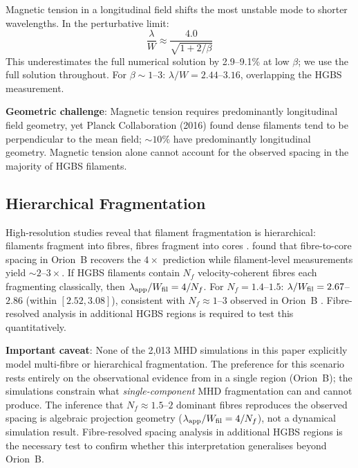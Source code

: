 \documentclass[twoside,twocolumn]{mnras}
\begin{document}
Magnetic tension in a longitudinal field \citep{Nakamura1993} shifts the most unstable
mode to shorter wavelengths. In the perturbative limit:
\begin{equation}
\frac{\lambda}{W} \approx \frac{4.0}{\sqrt{1 + 2/\beta}}
\label{eq:tension}
\end{equation}
This underestimates the full numerical solution by 2.9--9.1\% at low $\beta$; we use
the full solution throughout. For $\beta \sim 1$--$3$: $\lambda/W = 2.44$--$3.16$,
overlapping the HGBS measurement.

\textbf{Geometric challenge}: Magnetic tension requires predominantly longitudinal field
geometry, yet Planck Collaboration (2016) found dense filaments tend to be perpendicular
to the mean field; ${\sim}10\%$ have predominantly longitudinal geometry. Magnetic tension
alone cannot account for the observed spacing in the majority of HGBS filaments.

\subsection{Hierarchical Fragmentation}

High-resolution studies reveal that filament fragmentation is hierarchical: filaments
fragment into fibres, fibres fragment into cores \citep{Hacar2013, Hacar2018}.
\citet{Yang2024} found that fibre-to-core spacing in Orion~B recovers the $4\times$
prediction while filament-level measurements yield ${\sim}2$--$3\times$. If HGBS
filaments contain $N_f$ velocity-coherent fibres each fragmenting classically, then
$\lambda_{\rm app}/W_{\rm fil} = 4/N_f$. For $N_f = 1.4$--$1.5$:
$\lambda/W_{\rm fil} = 2.67$--$2.86$ (within $[2.52, 3.08]$), consistent with
$N_f \approx 1$--$3$ observed in Orion~B \citep{Hacar2018}.
Fibre-resolved analysis in additional HGBS regions is required to test this
quantitatively.

\textbf{Important caveat}: None of the 2,013 MHD simulations in this paper explicitly
model multi-fibre or hierarchical fragmentation. The preference for this scenario
rests entirely on the observational evidence from \citet{Yang2024} in a single region
(Orion~B); the simulations constrain what \textit{single-component} MHD fragmentation
can and cannot produce. The inference that $N_f \approx 1.5$--$2$ dominant fibres
reproduces the observed spacing is algebraic projection geometry ($\lambda_{\rm app}/W_{\rm fil}
= 4/N_f$), not a dynamical simulation result. Fibre-resolved spacing analysis in
additional HGBS regions is the necessary test to confirm whether this interpretation
generalises beyond Orion~B.
\end{document}
